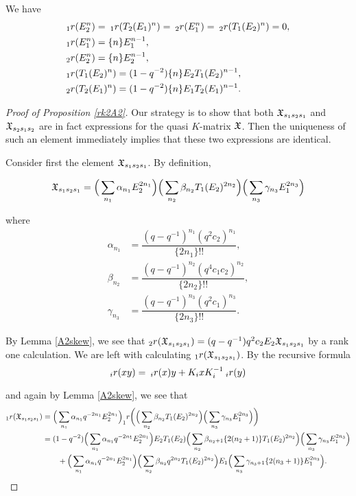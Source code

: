 \documentclass[a4 paper, 10pt]{article}
\begin{document}
\begin{lemma} \label{A2skew}
	We have
		\begin{align*}
			&{}_{ 1 }r( E_2^n ) = \: {}_{ 1 }r( T_{2}(E_1)^n ) = \: {}_{ 2 }r( E_1^n ) = \: {}_{2}r( T_{1}(E_2)^n ) = 0,\\
			&{}_{ 1 }r( E_1^n ) = \{ n \} E_1^{n-1},\\
			&{}_{ 2 }r( E_2^n ) = \{ n \} E_2^{n-1},\\
			&{}_{ 1 }r( T_{1}(E_2)^n ) = (1 - q^{-2}) \{ n \} E_2 T_{1}(E_2)^{n-1},\\
			&{}_{ 2 }r( T_{2}(E_1)^n ) = (1 - q^{-2}) \{ n \} E_1 T_{2}(E_1)^{n-1}.
		\end{align*}
\end{lemma}
\begin{proof}[Proof of Proposition \ref{rk2A2}]
	Our strategy is to show that both $\mathfrak{X}_{s_1s_2s_1}$ and $\mathfrak{X}_{s_2s_1s_2}$ are in fact expressions for the quasi $K$-matrix $\mathfrak{X}$. Then the uniqueness of such an element \cite[Theorem 6.10]{a-BK15} immediately implies that these two expressions are identical.
	
	Consider first the element $\mathfrak{X}_{s_1s_2s_1}$. By definition,
		
		\begin{equation}
			\mathfrak{X}_{s_1s_2s_1} = \Big(\sum_{n_1} \alpha_{n_1} E_2^{2n_1} \Big) \Big(\sum_{n_2} \beta_{n_2} T_{1}(E_2)^{2n_2} \Big) \Big(\sum_{n_3} \gamma_{n_3} E_1^{2n_3} \Big)
		\end{equation}
	
	where
		\begin{align*}
			\alpha_{n_1} &= \dfrac{(q-q^{-1})^{n_1}(q^2c_2)^{n_1}}{ \{ 2n_1 \}!!},\\
			\beta_{n_2} &= \dfrac{(q-q^{-1})^{n_2}(q^4c_1c_2)^{n_2}}{ \{ 2n_2 \}!!},\\
			\gamma_{n_3} &= \dfrac{(q-q^{-1})^{n_3}(q^2c_1)^{n_3}}{ \{ 2n_3 \}!!}.
		\end{align*}
		
	By Lemma \ref{A2skew}, we see that ${}_{2}r(\mathfrak{X}_{s_1s_2s_1}) = (q-q^{-1})q^2c_2E_2\mathfrak{X}_{s_1s_2s_1}$ by a rank one calculation. We are left with calculating ${}_{1}r(\mathfrak{X}_{s_1s_2s_1})$. By the recursive formula
		\begin{equation}
			{}_{i}r(xy) = \: {}_{i}r(x)y + K_ixK_i^{-1} \:{}_{i}r(y)
		\end{equation}

	and again by Lemma \ref{A2skew}, we see that
		\begin{align*}
			{}_{1}r(\mathfrak{X}_{s_1s_2s_1}) 	&= \Big( \sum_{n_1} \alpha_{n_1} q^{-2n_1} E_2^{2n_1} \Big) _{1}r \bigg(   \Big(\sum_{n_2} \beta_{n_2} T_{1}(E_2)^{2n_2} \Big) \Big(\sum_{n_3} \gamma_{n_3} E_1^{2n_3} \Big)  \bigg) \\
										&= (1-q^{-2}) \Big( \sum_{n_1} \alpha_{n_1} q^{-2n_1} E_2^{2n_1} \Big) E_2T_{1}(E_2) \Big( \sum_{n_2 } \beta_{n_2 + 1} \{ 2(n_2+1) \} T_{1}(E_2)^{2n_2} \Big) \Big( \sum_{n_3} \gamma_{n_3} E_1^{2n_3} \Big) \\
										&\qquad{} +  \Big( \sum_{n_1} \alpha_{n_1} q^{-2n_1} E_2^{2n_1} \Big) \Big(\sum_{n_2} \beta_{n_2} q^{2n_2} T_{1}(E_2)^{2n_2} \Big) E_1 \Big( \sum_{n_3} \gamma_{n_3+1} \{ 2(n_3+1) \} E_1^{2n_3} \Big).
		\end{align*}
	

\end{proof}
\end{document}
